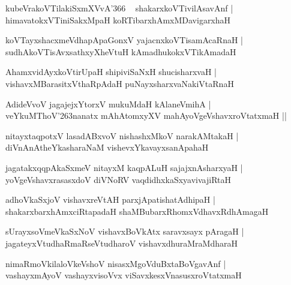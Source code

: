 \documentclass[twoside,12pt,openright]{book}
\def\S{\char'263}
\newcounter{shloka}[chapter]
\begin{document}
\begin{shloka}%
kubeVrakoVTilakiSxmXVvA\char'366 ~ shakarxkoVTivilAsavAnf |\\
himavatokxVTiniSakxMpaH koRTibarxhAmxMDavigarxhaH 
\end{shloka}

\begin{shloka}%
koVTayxshacxmeVdhapApaGonxV yajacnxkoVTisamAcaRnaH |\\
sudhAkoVTisAvxsathxyXheVtuH kAmadhukokxVTikAmadaH
\end{shloka}

\begin{shloka}%
AhamxvidAyxkoVtirUpaH shipiviSaNxH shucisharxvaH |\\
vishavxMBarasitxVthaRpAdaH puNayxsharxvaNakiVtaRnaH 
\end{shloka}

\begin{shloka}%
AdideVvoV jagajejxYtorxV mukuMdaH kAlaneVmihA |\\
veYkuMThoV\S nanatx mAhAtomxyXV mahAyoVgeVshavxroVtatxmaH ||
\end{shloka}

\begin{shloka}%
nitayxtaqpotxV lasadABxvoV nishashxMkoV narakAMtakaH |\\
diVnAnAtheYkasharaNaM vishevxYkavayxsanApahaH
\end{shloka}

\begin{shloka}%
jagatakxqqpAkaSxmeV nitayxM kaqpALuH sajajxnAsharxyaH |\\
yoVgeVshavxrasasxdoV diVNoRV vaqdidhxkaSxyavivajiRtaH 
\end{shloka}

\begin{shloka}%
adhoVkaSxjoV vishavxreVtAH parxjApatishatAdhipaH |\\
shakarxbarxhAmxciRtapadaH shaMBubarxRhomxVdhavxRdhAmagaH
\end{shloka}

\begin{shloka}%
sUrayxsoVmeVkaSxNoV vishavxBoVkAtx saravxsayx pAragaH |\\
jagateyxVtudhaRmaRseVtudharoV vishavxdhuraMraMdharaH 
\end{shloka}

\begin{shloka}%
nimaRmoVkilaloVkeVshoV nisasxMgoVduBxtaBoVgavAnf |\\
vashayxmAyoV vashayxvisoVvx viSavxkesxVnasusxroVtatxmaH 
\end{shloka}
\end{document}

